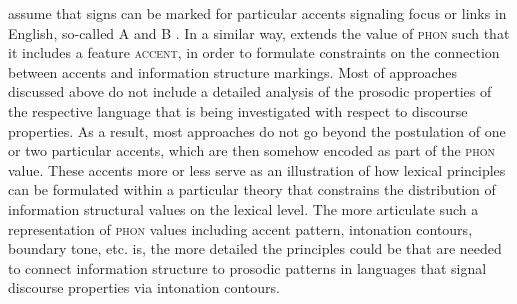 \documentclass[output=paper
	        ,collection
	        ,collectionchapter
 	        ,biblatex
                ,babelshorthands
                ,newtxmath
                ,draftmode
                ,colorlinks, citecolor=brown
]{langscibook}
\begin{document}
\cite{EV96a} assume that signs can be marked for particular accents
signaling focus or links in English, so-called A and B .
In a similar way, \cite{deKuthy2002a} extends the value of
 \textsc{phon} such that it includes a feature
 \textsc{accent}, in order to formulate constraints on
the connection between accents and information structure markings.
Most of approaches discussed above do not include a detailed analysis
of the prosodic properties of the respective language that is being
investigated with respect to discourse properties. As a result, most
approaches do not go beyond the postulation of one or two particular
accents, which are then somehow encoded as part of the \textsc{phon}
value. These accents more or less serve as an illustration of how lexical
principles can be formulated within a particular theory that constrains
the distribution of information structural values on the lexical
level. The more articulate such a representation of \textsc{phon}
values including accent pattern, intonation contours, boundary tone,
etc. is, the more detailed the principles could be that are needed to
connect information structure to prosodic patterns in languages that
signal discourse properties via intonation contours.
\end{document}
